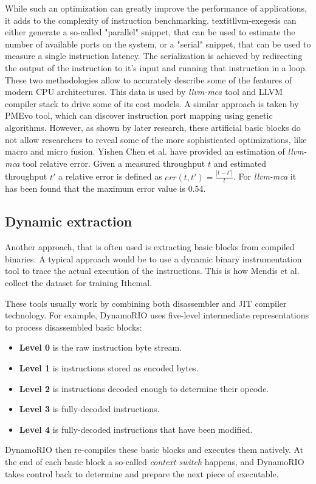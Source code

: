While such an optimization can greatly improve the performance of applications, it adds to the complexity of instruction benchmarking. textit{llvm-exegesis} can either generate a so-called "parallel" snippet, that can be used to estimate the number of available ports on the system, or a "serial" snippet, that can be used to measure a single instruction latency. The serialization is achieved by redirecting the output of the instruction to it's input and running that instruction in a loop. These two methodologies allow to accurately describe some of the features of modern CPU architectures. This data is used by \textit{llvm-mca} tool and LLVM compiler stack to drive some of its cost models. A similar approach is taken by PMEvo tool, which can discover instruction port mapping using genetic algorithms\cite{ritterPMEvoPortableInference2020}. However, as shown by later research, these artificial basic blocks do not allow researchers to reveal some of the more sophisticated optimizations, like macro and micro fusion. Yishen Chen et al. \cite{chenBHiveBenchmarkSuite2019} have provided an estimation of \textit{llvm-mca} tool relative error. Given a measured throughput $t$ and estimated throughput $t'$ a relative error is defined as $err(t, t') = \frac{|t - t'|}{t}$. For \textit{llvm-mca} it has been found that the maximum error value is 0.54.

\subsection{Dynamic extraction}

Another approach, that is often used is extracting basic blocks from compiled binaries. A typical approach would be to use a dynamic binary instrumentation tool to trace the actual execution of the instructions. This is how Mendis et al. collect the dataset for training Ithemal\cite{mendisIthemalAccuratePortable2019}.

These tools usually work by combining both disassembler and JIT compiler technology. For example, DynamoRIO uses five-level intermediate representations to process disassembled basic blocks:
\begin{itemize}
	\item \textbf{Level 0} is the raw instruction byte stream.
	\item \textbf{Level 1} is instructions stored as encoded bytes.
	\item \textbf{Level 2} is instructions decoded enough to determine their opcode.
	\item \textbf{Level 3} is fully-decoded instructions.
	\item \textbf{Level 4} is fully-decoded instructions that have been modified.
\end{itemize}
DynamoRIO then re-compiles these basic blocks and executes them natively. At the end of each basic block a so-called \textit{context switch} happens, and DynamoRIO takes control back to determine and prepare the next piece of executable.

